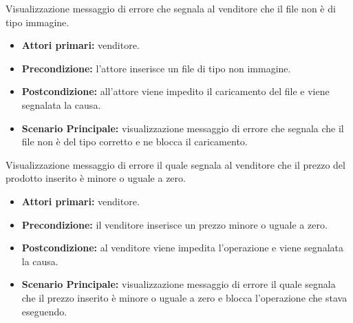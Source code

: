 \begin{comment}
\UC{Visualizzazione messaggio di errore prodotto non disponibile}
L'acquirente o l'utente non autenticato richiede un prodotto che non è disponibile.
\begin{itemize}
    \item \textbf{Attori primari:} acquirente o utente non autenticato;
    \item \textbf{Precondizione:} l'attore richiede di aggiungere al carrello un prodotto non disponibile;
    \item \textbf{Postcondizione:} viene impedita l'aggiunta al carrello e segnalata la causa.
    \item \textbf{Scenario principale:}
        \begin{itemize}
            \item L'utente richiede di aggiungere al carrello un prodotto non disponibile;
            \item Viene scartata la modifica, il carrello rimane invariato;
            \item Viene visualizzato un visualizzato un errore che indica la non disponibilità del prodotto.
        \end{itemize}
\end{itemize}
\end{comment}

Visualizzazione messaggio di errore che segnala al venditore che il file non è di tipo immagine.
\begin{itemize}
    \item \textbf{Attori primari:} venditore.
    \item \textbf{Precondizione:} l'attore inserisce un file di tipo non immagine.
    \item \textbf{Postcondizione:} all'attore viene impedito il caricamento del file e viene segnalata la causa.
    \item \textbf{Scenario Principale:} visualizzazione messaggio di errore che segnala che il file non è del tipo corretto e ne blocca il caricamento.
\end{itemize}

Visualizzazione messaggio di errore il quale segnala al venditore che il prezzo del prodotto inserito è minore o uguale a zero.
\begin{itemize}
    \item \textbf{Attori primari:} venditore.
    \item \textbf{Precondizione:} il venditore inserisce un prezzo minore o uguale a zero.
    \item \textbf{Postcondizione:} al venditore viene impedita l'operazione e viene segnalata la causa.
    \item \textbf{Scenario Principale:} visualizzazione messaggio di errore il quale segnala che il prezzo inserito è minore o uguale a zero e blocca l'operazione che stava eseguendo.
\end{itemize}


